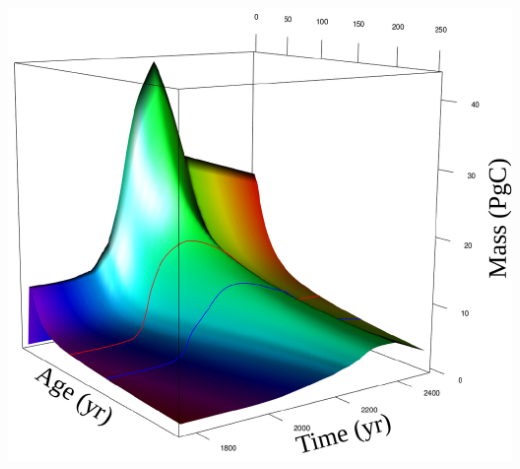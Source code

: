 \begin{columns}
\begin{column}{\rc}
\begin{minipage}[T]{\textwidth}
			\includegraphics[width=0.9\rc]{images/content/3D.pdf}
		\end{minipage}
	\end{column}
\end{columns}
